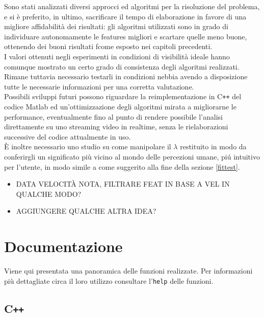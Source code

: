 \documentclass[12pt]{report}
\begin{document}
\noindent Sono stati analizzati diversi approcci ed algoritmi per la risoluzione del problema, e si \`e preferito, in ultimo, sacrificare il tempo di elaborazione in favore di una migliore affidabilit\`a dei risultati: gli algoritmi utilizzati sono in grado di individuare autonomamente le features migliori e scartare quelle meno buone, ottenendo dei buoni risultati fcome esposto nei capitoli precedenti.\\

\noindent I valori ottenuti negli esperimenti in condizioni di visibilit\`a ideale hanno comunque mostrato un certo grado di consistenza degli algoritmi realizzati. Rimane tuttavia necessario testarli in condizioni nebbia avendo a disposizione tutte le necessarie informazioni per una corretta valutazione.\\

\noindent Possibili sviluppi futuri possono riguardare la reimplementazione in C\verb|++| del codice Matlab ed un'ottimizzazione degli algoritmi mirata a migliorarne le performance, eventualmente fino al punto di rendere possibile l'analisi direttamente su uno streaming video in realtime, senza le rielaborazioni successive del codice attualmente in uso.\\

\noindent \`E inoltre necessario uno studio su come manipolare il $\lambda$ restituito in modo da conferirgli un significato pi\`u vicino al mondo delle percezioni umane, pi\'u intuitivo per l'utente, in modo simile a come suggerito alla fine della sezione \ref{fittest}.\\

\begin{itemize}
	\item	DATA VELOCIT\`A NOTA, FILTRARE FEAT IN BASE A VEL IN QUALCHE MODO?
	\item	AGGIUNGERE QUALCHE ALTRA IDEA?
\end{itemize}



\chapter{Documentazione}


Viene qui presentata una panoramica delle funzioni realizzate. Per informazioni pi\`u dettagliate circa il loro utilizzo consultare l'\verb|help| delle funzioni.

\section[C++]{C\verb_++_}
\end{document}
